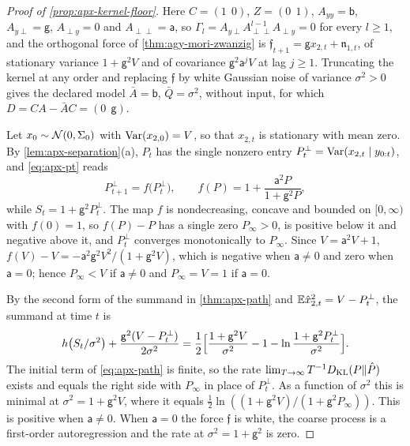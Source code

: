 \begin{proof}[Proof of \cref{prop:apx-kernel-floor}]
Here $C=(1\ \ 0)$, $Z=(0\ \ 1)$, $A_{yy}=\mathsf b$, $A_{y\perp}=\mathsf g$, $A_{\perp y}=0$ and $A_{\perp\perp}=\mathsf a$, so $\Gamma_l=A_{y\perp}A_{\perp\perp}^{l-1}A_{\perp y}=0$ for every $l\ge1$, and the orthogonal force of \cref{thm:agy-mori-zwanzig} is $\mathfrak f_{t+1}=\mathsf gx_{2,t}+\mathfrak n_{1,t}$, of stationary variance $1+\mathsf g^2V$ and of covariance $\mathsf g^2\mathsf a^jV$ at lag $j\ge1$. Truncating the kernel at any order and replacing $\mathfrak f$ by white Gaussian noise of variance $\sigma^2>0$ gives the declared model $\bar A=\mathsf b$, $\bar Q=\sigma^2$, without input, for which $D=CA-\bar AC=(0\ \ \mathsf g)$.

Let $x_0\sim\mathcal{N}(0,\Sigma_0)$ with $\operatorname{Var}(x_{2,0})=V$, so that $x_{2,t}$ is stationary with mean zero. By \cref{lem:apx-separation}(a), $P_t$ has the single nonzero entry $P^\perp_t=\operatorname{Var}(x_{2,t}\mid y_{0:t})$, and \cref{eq:apx-pt} reads
\begin{equation*}
P^\perp_{t+1}=f\bigl(P^\perp_t\bigr),\qquad f(P)=1+\frac{\mathsf a^2P}{1+\mathsf g^2P},
\end{equation*}
while $S_t=1+\mathsf g^2P^\perp_t$. The map $f$ is nondecreasing, concave and bounded on $[0,\infty)$ with $f(0)=1$, so $f(P)-P$ has a single zero $P_\infty>0$, is positive below it and negative above it, and $P^\perp_t$ converges monotonically to $P_\infty$. Since $V=\mathsf a^2V+1$, $f(V)-V=-\mathsf a^2\mathsf g^2V^2/(1+\mathsf g^2V)$, which is negative when $\mathsf a\ne0$ and zero when $\mathsf a=0$; hence $P_\infty<V$ if $\mathsf a\ne0$ and $P_\infty=V=1$ if $\mathsf a=0$.

By the second form of the summand in \cref{thm:apx-path} and $\mathbb{E}\hat x_{2,t}^2=V-P^\perp_t$, the summand at time $t$ is
\begin{equation*}
h\bigl(S_t/\sigma^2\bigr)+\frac{\mathsf g^2(V-P^\perp_t)}{2\sigma^2}=\frac12\Bigl[\frac{1+\mathsf g^2V}{\sigma^2}-1-\ln\frac{1+\mathsf g^2P^\perp_t}{\sigma^2}\Bigr].
\end{equation*}
The initial term of \cref{eq:apx-path} is finite, so the rate $\lim_{T\to\infty}T^{-1}D_{\mathrm{KL}}(P\Vert\hat P)$ exists and equals the right side with $P_\infty$ in place of $P^\perp_t$. As a function of $\sigma^2$ this is minimal at $\sigma^2=1+\mathsf g^2V$, where it equals $\frac12\ln((1+\mathsf g^2V)/(1+\mathsf g^2P_\infty))$. This is positive when $\mathsf a\ne0$. When $\mathsf a=0$ the force $\mathfrak f$ is white, the coarse process is a first-order autoregression and the rate at $\sigma^2=1+\mathsf g^2$ is zero.
\end{proof}

